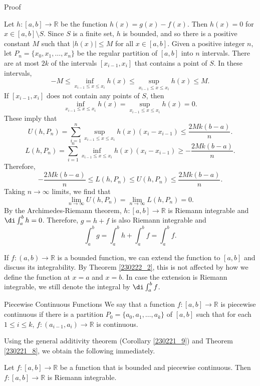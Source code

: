 \begin{myproof}{Proof}
 

Let $h:[a,b]\to\mathbb{R}$ be the function $h(x)=g(x)-f(x)$. Then   $h(x)=0$ for $x\in  [a,b]\setminus S$. Since $S$ is a finite set, $h$ is bounded, and so there is a positive constant $M$ such that $|h(x)|\leq M$ for all $x\in [a,b]$. Given a positive integer $n$, let $P_n=\{x_0, x_1, \ldots, x_n\}$  be the regular partition of $[a,b]$ into $n$ intervals. There are at most $2k$ of the intervals $[x_{i-1}, x_i]$ that contains a point of $S$. In these intervals, 
\[-M\leq \inf_{x_{i-1}\leq x\leq x_i}h(x)\leq \sup_{x_{i-1}\leq x\leq x_i}h(x)\leq  M.\] If $[x_{i-1},x_i]$   does not contain any points of $S$, then 
\[\inf_{x_{i-1}\leq x\leq x_i}h(x)=\sup_{x_{i-1}\leq x\leq x_i}h(x)=0.\]
These imply that
\[U(h,P_n) =\sum_{i=1}^n \sup_{x_{i-1}\leq x\leq x_i}h(x) (x_{i}-x_{i-1})\leq  \frac{2Mk(b-a)}{n}.\]
\[L(h,P_n) =\sum_{i=1}^n \inf_{x_{i-1}\leq x\leq x_i}h(x) (x_{i}-x_{i-1})\geq   -\frac{2Mk(b-a)}{n}.\]
\bp
Therefore,
\[-\frac{2Mk(b-a)}{n}\leq L(h,P_n)\leq U(h,P_n)\leq \frac{2Mk(b-a)}{n}.\]
Taking $n\to \infty$ limits, we find that
\[\lim_{n\to\infty}  U(h,P_n)=\lim_{n\to\infty}L(h,P_n) =0.\]By the Archimedes-Riemann theorem, $h:[a,b]\to\mathbb{R}$
 is Riemann integrable and
$\di  \int_a^b h=0$.
Therefore, $g=h+f$ is also Riemann integrable and 
\[\int_a^b g=\int_a^bh+\int_a^bf=\int_a^b f.\]
\end{myproof}


\begin{remark}{}
If $f:(a,b)\to\mathbb{R}$ is a bounded function, we can extend the function to $[a,b]$ and discuss its integrability. By Theorem \ref{230222_2}, this is not affected by how we define the function at $x=a$ and $x=b$. In case the extension is Riemann integrable, we still denote the integral by $\di\int_a^b f$.
\end{remark}
\begin{definition}{Piecewise Continuous Functions}
We say that a function $f:[a,b]\to\mathbb{R}$ is piecewise continuous if there is a partition $P_0=\{a_0, a_1, \ldots, a_k\}$ of $[a,b]$ such that for each $1\leq i\leq k$, $f:(a_{i-1}, a_i)\to \mathbb{R}$ is continuous. 
\end{definition} 

Using the general additivity theorem (Corollary \ref{230221_9}) and Theorem \ref{230221_8}, we obtain the following immediately.
\begin{theorem}[label=230221_10]{}
Let $f:[a,b]\to\mathbb{R}$ be a function that is bounded and piecewise continuous. Then $f:[a,b]\to\mathbb{R}$ is Riemann integrable.
\end{theorem}

